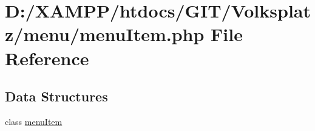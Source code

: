 \hypertarget{menu_2menu_item_8php}{}\section{D\+:/\+X\+A\+M\+P\+P/htdocs/\+G\+I\+T/\+Volksplatz/menu/menu\+Item.php File Reference}
\label{menu_2menu_item_8php}
\subsection*{Data Structures}
\begin{DoxyCompactItemize}
\item 
class \mbox{\hyperlink{classmenu_item}{menu\+Item}}
\end{DoxyCompactItemize}
